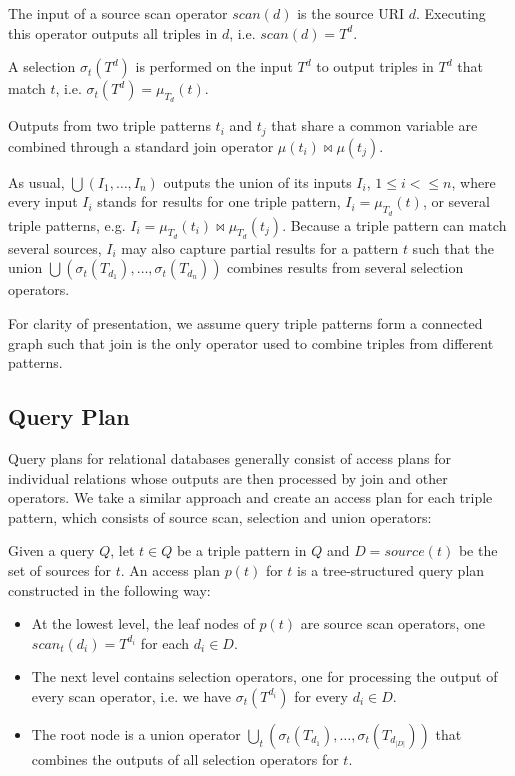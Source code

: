 \begin{definition} The input of a source scan operator $scan(d)$ is the source URI $d$.
Executing this operator outputs all triples in $d$, i.e. $scan(d) = T^d$.
\end{definition}

\begin{definition}[Selection]  A selection $\sigma_t(T^d)$ is performed on the input $T^d$ to output
triples in $T^d$ that match $t$, i.e. $\sigma_t(T^d) = \mu_{T_d}(t)$. 
\end{definition}

Outputs from two triple patterns $t_i$ and $t_j$ that share a common variable are combined through a standard join operator $\mu(t_i)\Join\mu(t_j)$. 

\begin{definition}[Union] As usual, $\bigcup(I_1,\ldots,I_n)$
outputs the union of its inputs $I_i$, $1\leq i < \leq n$, where every input $I_i$ stands for results for one triple pattern, $I_i = \mu_{T_d}(t)$, or several triple patterns, e.g. $I_i = \mu_{T_d}(t_i)\Join\mu_{T_d}(t_j)$. Because a triple pattern can match several sources, $I_i$ may also capture partial results for a pattern $t$ such that the union
$\bigcup(\sigma_t(T_{d_1}),\ldots,\sigma_t(T_{d_n}))$ combines results from several selection operators.   
\end{definition}

For clarity of presentation, we assume query triple patterns form a connected graph such that join is the only operator used to combine triples from different patterns. 


\subsection{Query Plan}
\label{sec:basicshape}
Query plans for relational databases generally consist of access plans
for individual relations whose outputs are then processed by join and
other operators. We take a similar approach and create an
access plan for each triple pattern, which consists of source scan, selection and union
operators:

\begin{definition}
  Given a query $Q$, let $t \in Q$ be a triple pattern in $Q$ and $D = source(t)$ be the set of sources for $t$. An access plan $p(t)$ for $t$ is a tree-structured query plan constructed in the
  following way:
  \begin{itemize}
  \item At the lowest level, the leaf nodes of $p(t)$ are source scan operators, one
    $scan_t(d_i) = T^{d_i}$ for each $d_i \in D$.
  \item The next level contains selection operators, one
    for processing the output of every scan operator, i.e. we have $\sigma_t(T^{d_i})$ for every $d_i \in D$.     
   \item The root node is a union operator $\bigcup_t(\sigma_t(T_{d_1}),\ldots,\sigma_t(T_{d_{|D|}}))$ that combines the outputs of all selection operators for $t$.    
  \end{itemize}
\end{definition}

